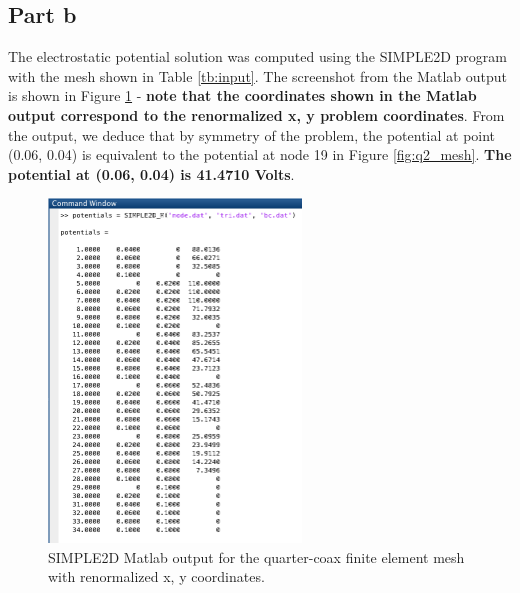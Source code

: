 \documentclass[11pt]{amsart}
\begin{document}
\subsection*{Part b}
The electrostatic potential solution was computed using the SIMPLE2D program with the mesh shown in Table \ref{tb:input}. The screenshot from the Matlab output is shown in Figure \ref{fig:q2_potentials} - \textbf{note that the coordinates shown in the Matlab output correspond to the renormalized x, y problem coordinates}. From the output, we deduce that by symmetry of the problem, the potential at point  (0.06, 0.04) is equivalent to the potential at node 19 in Figure \ref{fig:q2_mesh}. \textbf{The potential at (0.06, 0.04) is 41.4710 Volts}.

\begin{figure}[h]
    \includegraphics[width=0.6\textwidth]{assets/q2_potentials}
    \caption{SIMPLE2D Matlab output for the quarter-coax finite element mesh with renormalized x, y coordinates.}
    \label{fig:q2_potentials}
\end{figure}

\pagebreak
\end{document}
